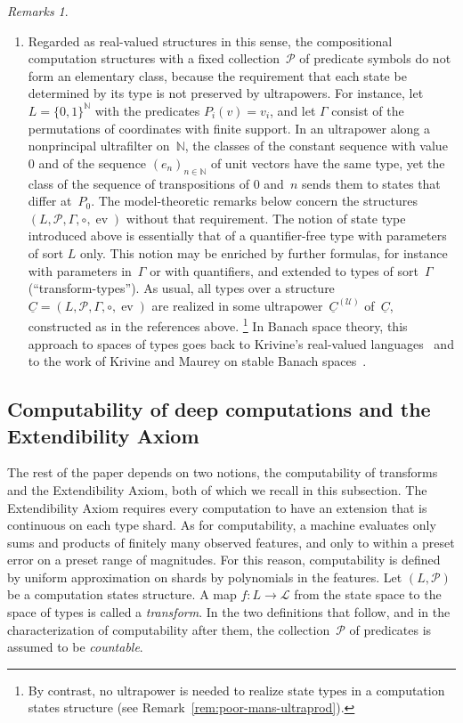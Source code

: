 \documentclass[psamsfonts]{amsart}
\theoremstyle{definition}
\theoremstyle{remark}
\newtheorem{rems}[thm]{Remarks}
\numberwithin{equation}{section}
\begin{document}
\begin{rems}
\begin{enumerate}
  \item
    Regarded as real-valued structures in this sense, the compositional computation structures with a fixed collection~$\mathcal{P}$ of predicate symbols do not form an elementary class, because the requirement that each state be determined by its type is not preserved by ultrapowers.
    For instance, let $L=\{0,1\}^{\mathbb{N}}$ with the predicates $P_i(v)=v_i$, and let $\Gamma$ consist of the permutations of coordinates with finite support.
    In an ultrapower along a nonprincipal ultrafilter on~$\mathbb{N}$, the classes of the constant sequence with value~$0$ and of the sequence $(e_n)_{n\in\mathbb{N}}$ of unit vectors have the same type, yet the class of the sequence of transpositions of $0$ and~$n$ sends them to states that differ at~$P_0$.
    The model-theoretic remarks below concern the structures $(L,\mathcal{P},\Gamma,\circ,\operatorname{ev})$ without that requirement.
    The notion of state type introduced above is essentially that of a quantifier-free type with parameters of sort $L$ only.
    This notion may be enriched by further formulas, for instance with parameters in~$\Gamma$ or with quantifiers, and extended to types of sort~$\Gamma$ (“transform-types”).
    As usual, all types over a structure $\underline{C}=(L,\mathcal{P}, \Gamma, \circ, \operatorname{ev})$
    are realized in some ultrapower~$\underline{C}^{(\mathcal{U})}$ of~$\underline{C}$, constructed as in the references above.%
    \footnote{By contrast, no ultrapower is needed to realize state types in a computation states structure (see Remark~\ref{rem:poor-mans-ultraprod}).}
    In Banach space theory, this approach to spaces of types goes back to Krivine's real-valued languages~\cite{Krivine:1972,Krivine:1974} and to the work of Krivine and Maurey on stable Banach spaces~\cite{Krivine-Maurey:1981}.
  \end{enumerate}
\end{rems}

\subsection{Computability of deep computations and the Extendibility Axiom}
\label{sec:computability}
The rest of the paper depends on two notions, the computability of transforms and the Extendibility Axiom, both of which we recall in this subsection.
The Extendibility Axiom requires every computation to have an extension that is continuous on each type shard.
As for computability, a machine evaluates only sums and products of finitely many observed features, and only to within a preset error on a preset range of magnitudes.
For this reason, computability is defined by uniform approximation on shards by polynomials in the features.
Let $(L,\mathcal{P})$ be a computation states structure.
A map $f\colon L\to\mathcal{L}$ from the state space to the space of types is called a \emph{transform}.
In the two definitions that follow, and in the characterization of computability after them, the collection~$\mathcal{P}$ of predicates is assumed to be \emph{countable}.
\end{document}
